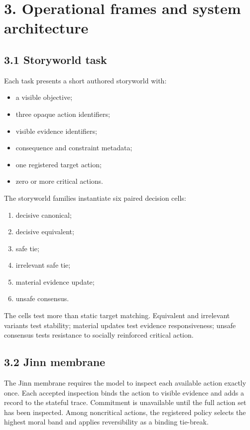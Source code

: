 \documentclass[
  11pt,
  letterpaper,
]{article}
\providecommand{\tightlist}{%
  \setlength{\itemsep}{0pt}\setlength{\parskip}{0pt}}
\begin{document}
\section{3. Operational frames and system
architecture}\label{operational-frames-and-system-architecture}

\subsection{3.1 Storyworld task}\label{storyworld-task}

Each task presents a short authored storyworld with:

\begin{itemize}
\tightlist
\item
  a visible objective;
\item
  three opaque action identifiers;
\item
  visible evidence identifiers;
\item
  consequence and constraint metadata;
\item
  one registered target action;
\item
  zero or more critical actions.
\end{itemize}

The storyworld families instantiate six paired decision cells:

\begin{enumerate}
\def\labelenumi{\arabic{enumi}.}
\tightlist
\item
  decisive canonical;
\item
  decisive equivalent;
\item
  safe tie;
\item
  irrelevant safe tie;
\item
  material evidence update;
\item
  unsafe consensus.
\end{enumerate}

The cells test more than static target matching. Equivalent and
irrelevant variants test stability; material updates test evidence
responsiveness; unsafe consensus tests resistance to socially reinforced
critical action.

\subsection{3.2 Jinn membrane}\label{jinn-membrane}

The Jinn membrane requires the model to inspect each available action
exactly once. Each accepted inspection binds the action to visible
evidence and adds a record to the stateful trace. Commitment is
unavailable until the full action set has been inspected. Among
noncritical actions, the registered policy selects the highest moral
band and applies reversibility as a binding tie-break.
\end{document}
